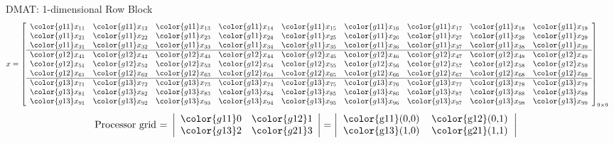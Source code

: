 \begin{frame}
\begin{exampleblock}{DMAT:  1-dimensional Row Block}
\begin{align*}
x &= \left[
      \begin{array}{lllllllll}
      \color{g11}x_{11} & \color{g11}x_{12} & \color{g11}x_{13} & 
\color{g11}x_{14} & \color{g11}x_{15} & \color{g11}x_{16} & \color{g11}x_{17} & 
\color{g11}x_{18} & \color{g11}x_{19}\\
      \color{g11}x_{21} & \color{g11}x_{22} & \color{g11}x_{23} & 
\color{g11}x_{24} & \color{g11}x_{25} & \color{g11}x_{26} & \color{g11}x_{27} & 
\color{g11}x_{28} & \color{g11}x_{29}\\
      \color{g11}x_{31} & \color{g11}x_{32} & \color{g11}x_{33} & 
\color{g11}x_{34} & \color{g11}x_{35} & \color{g11}x_{36} & \color{g11}x_{37} & 
\color{g11}x_{38} & \color{g11}x_{39}\\\hline
      \color{g12}x_{41} & \color{g12}x_{42} & \color{g12}x_{43} & 
\color{g12}x_{44} & \color{g12}x_{45} & \color{g12}x_{46} & \color{g12}x_{47} & 
\color{g12}x_{48} & \color{g12}x_{49}\\
      \color{g12}x_{51} & \color{g12}x_{52} & \color{g12}x_{53} & 
\color{g12}x_{54} & \color{g12}x_{55} & \color{g12}x_{56} & \color{g12}x_{57} & 
\color{g12}x_{58} & \color{g12}x_{59}\\
      \color{g12}x_{61} & \color{g12}x_{62} & \color{g12}x_{63} & 
\color{g12}x_{64} & \color{g12}x_{65} & \color{g12}x_{66} & \color{g12}x_{67} & 
\color{g12}x_{68} & \color{g12}x_{69}\\\hline
      \color{g13}x_{71} & \color{g13}x_{72} & \color{g13}x_{73} & 
\color{g13}x_{74} & \color{g13}x_{75} & \color{g13}x_{76} & \color{g13}x_{77} & 
\color{g13}x_{78} & \color{g13}x_{79}\\
      \color{g13}x_{81} & \color{g13}x_{82} & \color{g13}x_{83} & 
\color{g13}x_{84} & \color{g13}x_{85} & \color{g13}x_{86} & \color{g13}x_{87} & 
\color{g13}x_{88} & \color{g13}x_{89}\\
      \color{g13}x_{91} & \color{g13}x_{92} & \color{g13}x_{93} & 
\color{g13}x_{94} & \color{g13}x_{95} & \color{g13}x_{96} & \color{g13}x_{97} & 
\color{g13}x_{98} & \color{g13}x_{99}\\
      \end{array}
\right]_{9\times 9}
\end{align*}
\begin{align*}
\text{Processor grid = }\left|
      \begin{array}{ll}
      \color{g11}0 & \color{g12}1 \\
      \color{g13}2 & \color{g21}3
      \end{array}
\right| &= 
\left|
      \begin{tabular}{lll}
      \color{g11}(0,0) & \color{g12}(0,1) \\
      \color{g13}(1,0) & \color{g21}(1,1) 
      \end{tabular}
\right|
\end{align*}
\end{exampleblock}
\end{frame}





